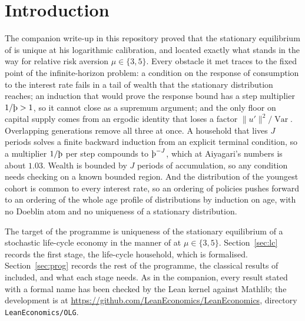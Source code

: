 \section{Introduction}

The companion write-up in this repository proved that the stationary equilibrium of
\citet{Aiyagari1994} is unique at his logarithmic calibration, and located exactly what stands in
the way for relative risk aversion $\mu\in\{3,5\}$. Every obstacle it met traces to the fixed point
of the infinite-horizon problem: a condition on the response of consumption to the interest rate
fails in a tail of wealth that the stationary distribution reaches; an induction that would prove
the response bound has a step multiplier $1/\Thorn>1$, so it cannot close as a supremum argument;
and the only floor on capital supply comes from an ergodic identity that loses a factor
$\|u'\|^2/\operatorname{Var}$. Overlapping generations remove all three at once. A household
that lives $J$ periods solves a finite backward induction from an explicit terminal condition, so
a multiplier $1/\Thorn$ per step compounds to $\Thorn^{-J}$, which at Aiyagari's numbers is about
$1.03$. Wealth is bounded by $J$ periods of accumulation, so any condition needs checking on a
known bounded region. And the distribution of the youngest cohort is common to every interest
rate, so an ordering of policies pushes forward to an ordering of the whole age profile of
distributions by induction on age, with no Doeblin atom and no uniqueness of a stationary
distribution.

The target of the programme is uniqueness of the stationary equilibrium of a stochastic
life-cycle economy in the manner of \citet{Huggett1996} at $\mu\in\{3,5\}$. Section~\ref{sec:lc}
records the first stage, the life-cycle household, which is formalised. Section~\ref{sec:prog}
records the rest of the programme, the classical results of \citet{Diamond1965} included, and
what each stage needs. As in the companion, every result stated with a formal name has been
checked by the Lean kernel against Mathlib; the development is at
\url{https://github.com/LeanEconomics/LeanEconomics}, directory \texttt{LeanEconomics/OLG}.
